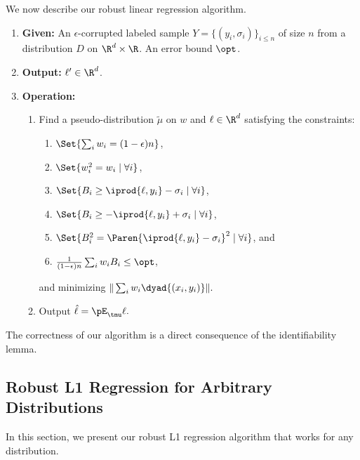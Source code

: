 


We now describe our robust linear regression algorithm. 
\begin{enumerate}
  \item \textbf{Given: } An $\epsilon$-corrupted labeled sample $Y = \{ (y_i, \sigma_i)\}_{i \leq n}$ of size $n$ from a distribution $D$ on $\R^d \times \R$. An error bound $\opt$.

  \item \textbf{Output: } $\ell' \in \R^d$. 

  \item \textbf{Operation: } 
    \begin{enumerate}
      \item Find a pseudo-distribution $\tilde{\mu}$ on $w$ and $\ell \in \R^{d}$ satisfying the constraints:
      \begin{enumerate}
        \item $\Set{\sum_i w_i = (1-\epsilon)n}$,
        \item $\Set{w_i^2 = w_i \mid \forall i}$,
        \item $\Set{B_i \geq \iprod{\ell,y_i} - \sigma_i \mid \forall i}$, 
        \item $\Set{B_i \geq -\iprod{\ell,y_i} + \sigma_i \mid \forall i}$,
        \item  $\Set{B_i^2 = \Paren{\iprod{\ell,y_i} - \sigma_i}^2 \mid \forall i}$, and
        \item $\frac{1}{(1-\epsilon)n} \sum_i w_i B_i \leq \opt$,
      \end{enumerate}
      and minimizing $\|\sum_i w_i \dyad{(x_i,y_i)}\|.$ 
      \item Output $\hat{\ell} = \pE_{\tmu} \ell.$
    \end{enumerate}
\end{enumerate}

The correctness of our algorithm is a direct consequence of the identifiability lemma.

\subsection{Robust L1 Regression for Arbitrary Distributions}
In this section, we present our robust L1 regression algorithm that works for any distribution. 

